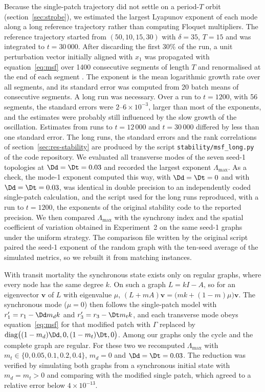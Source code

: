 Because the single-patch trajectory did not settle on a period-$T$ orbit (section~\ref{sec:strobe}), we estimated the largest Lyapunov exponent of each mode along a long reference trajectory rather than computing Floquet multipliers. The reference trajectory started from $(50,10,15,30)$ with $\delta = 35$, $T = 15$ and was integrated to $t = 30\,000$. After discarding the first 30\% of the run, a unit perturbation vector initially aligned with $x_1$ was propagated with equation~\eqref{eq:msf} over 1400 consecutive segments of length $T$ and renormalised at the end of each segment \citep{benettin1980}. The exponent is the mean logarithmic growth rate over all segments, and its standard error was computed from 20 batch means of consecutive segments. A long run was necessary. Over a run to $t = 1200$, with 56 segments, the standard errors were $2$--$6\times10^{-3}$, larger than most of the exponents, and the estimates were probably still influenced by the slow growth of the oscillation. Estimates from runs to $t = 12\,000$ and $t = 30\,000$ differed by less than one standard error. The long runs, the standard errors and the rank correlations of section~\ref{sec:res-stability} are produced by the script \texttt{stability/msf\_long.py} of the code repository. We evaluated all transverse modes of the seven seed-1 topologies at $\Dd = \Dt = 0.03$ and recorded the largest exponent $\Lambda_{\max}$. As a check, the mode-1 exponent computed this way, with $\Dd=\Dt=0$ and with $\Dd=\Dt=0.03$, was identical in double precision to an independently coded single-patch calculation, and the script used for the long runs reproduced, with a run to $t = 1200$, the exponents of the original stability code to the reported precision. We then compared $\Lambda_{\max}$ with the synchrony index and the spatial coefficient of variation obtained in Experiment~2 on the same seed-1 graphs under the uniform strategy. The comparison file written by the original script paired the seed-1 exponent of the random graph with the ten-seed average of the simulated metrics, so we rebuilt it from matching instances.

With transit mortality the synchronous state exists only on regular graphs, where every node has the same degree $k$. On such a graph $L = kI - A$, so for an eigenvector $\mathbf{v}$ of $L$ with eigenvalue $\mu$, $(L + mA)\mathbf{v} = \bigl(mk + (1-m)\mu\bigr)\mathbf{v}$. The synchronous mode ($\mu = 0$) then follows the single-patch model with $r_1' = r_1 - \Dd m_d k$ and $r_3' = r_3 - \Dt m_t k$, and each transverse mode obeys equation~\eqref{eq:msf} for that modified patch with $\Gamma$ replaced by $\mathrm{diag}\bigl((1-m_d)\Dd, 0, (1-m_t)\Dt, 0\bigr)$. Among our graphs only the cycle and the complete graph are regular. For these two we recomputed $\Lambda_{\max}$ with $m_t \in \{0, 0.05, 0.1, 0.2, 0.4\}$, $m_d = 0$ and $\Dd = \Dt = 0.03$. The reduction was verified by simulating both graphs from a synchronous initial state with $m_d = m_t > 0$ and comparing with the modified single patch, which agreed to a relative error below $4\times10^{-13}$.

